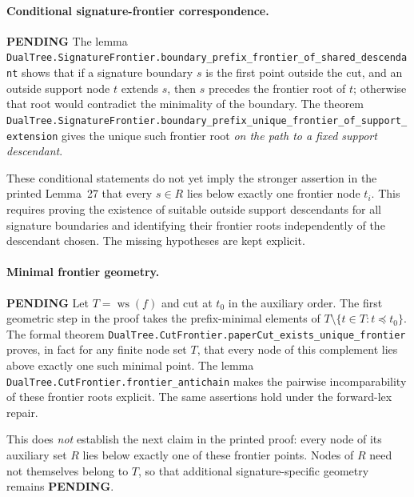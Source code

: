 \documentclass[11pt]{article}
\newcommand{\todo}{\textcolor{gray!70!black}{\textbf{PENDING}}}
\newcommand{\lean}[1]{\texttt{#1}}
\begin{document}
\paragraph{Conditional signature-frontier correspondence.} \todo
The lemma
\lean{DualTree.SignatureFrontier.boundary_prefix_frontier_of_shared_descendant}
shows that if a signature boundary $s$ is the first point outside the cut,
and an outside support node $t$ extends $s$, then $s$ precedes the
frontier root of $t$; otherwise that root would contradict the minimality
of the boundary.  The theorem
\lean{DualTree.SignatureFrontier.boundary_prefix_unique_frontier_of_support_extension}
gives the unique such frontier root \emph{on the path to a fixed support
descendant}.

These conditional statements do not yet imply the stronger assertion in
the printed Lemma~27 that every $s\in R$ lies below exactly one frontier
node $t_i$.  This requires proving the existence of suitable outside
support descendants for all signature boundaries and identifying their
frontier roots independently of the descendant chosen.  The missing
hypotheses are kept explicit.

\paragraph{Minimal frontier geometry.} \todo
Let $T=\operatorname{ws}(f)$ and cut at $t_0$ in the auxiliary order.
The first geometric step in the proof takes the prefix-minimal elements
of $T\setminus\{t\in T:t\preccurlyeq t_0\}$.  The formal theorem
\lean{DualTree.CutFrontier.paperCut_exists_unique_frontier}
proves, in fact for any finite node set $T$, that every node of this
complement lies above exactly one such minimal point.  The lemma
\lean{DualTree.CutFrontier.frontier_antichain} makes the pairwise
incomparability of these frontier roots explicit.  The same assertions
hold under the forward-lex repair.

This does \emph{not} establish the next claim in the printed proof:
every node of its auxiliary set $R$ lies below exactly one of these
frontier points.  Nodes of $R$ need not themselves belong to $T$, so
that additional signature-specific geometry remains \todo.
\end{document}
